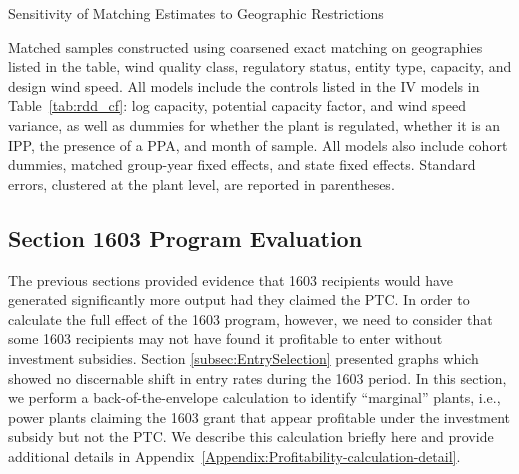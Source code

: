 \documentclass[12pt]{article}
\begin{document}
\begin{table}[h]
\begin{centering}
\caption{Sensitivity of Matching Estimates to Geographic Restrictions \label{tab:matching_table_cf}}

\par\end{centering}
\footnotesize

Matched samples constructed using coarsened exact matching on geographies listed in the table, wind quality class, regulatory status, entity type, capacity, and design wind speed. All models include the controls listed in the IV models in Table~\ref{tab:rdd_cf}: log capacity, potential capacity factor, and wind speed variance, as well as dummies for whether the plant is regulated, whether it is an IPP, the presence of a PPA, and month of sample. All models also include cohort dummies, matched group-year fixed effects, and state fixed effects. Standard errors, clustered at the plant level, are reported in parentheses.
\end{table}

\subsection{Section 1603 Program Evaluation\label{sec:results:eval}}

The previous sections provided evidence that 1603 recipients would have generated significantly more output had they claimed the PTC. In order to calculate the full effect of the 1603 program, however, we need to consider that some 1603 recipients may not have found it profitable to enter without investment subsidies. Section \ref{subsec:EntrySelection}  presented graphs which showed no discernable shift in entry rates during the 1603 period. In this section, we perform a back-of-the-envelope calculation to identify ``marginal'' plants, i.e., power plants claiming the 1603 grant that appear profitable under the investment subsidy but not the PTC. We describe this calculation briefly here and provide additional details in Appendix~\ref{Appendix:Profitability-calculation-detail}.
\end{document}
